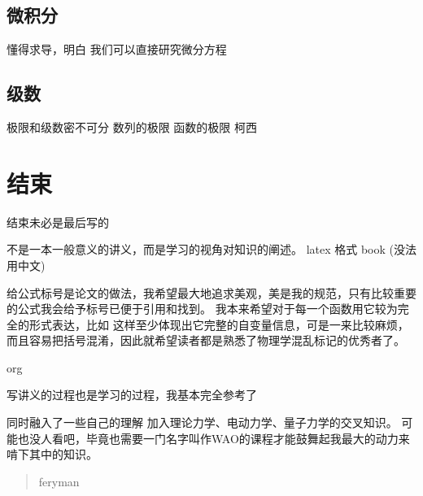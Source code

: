 \documentclass[11pt]{book}
\begin{document}
\chapter{微积分}
\label{sec:orgd871e60}
懂得求导，明白
我们可以直接研究微分方程
\chapter{级数}
\label{sec:org0e8a775}
极限和级数密不可分
数列的极限
函数的极限
柯西

\part{结束}
\label{sec:org2701e1a}
结束未必是最后写的

不是一本一般意义的讲义，而是学习的视角对知识的阐述。
latex 格式 book
(没法用中文)


给公式标号是论文的做法，我希望最大地追求美观，美是我的规范，只有比较重要的公式我会给予标号已便于引用和找到。
我本来希望对于每一个函数用它较为完全的形式表达，比如
这样至少体现出它完整的自变量信息，可是一来比较麻烦，而且容易把括号混淆，因此就希望读者都是熟悉了物理学混乱标记的优秀者了。

org

写讲义的过程也是学习的过程，我基本完全参考了

同时融入了一些自己的理解
加入理论力学、电动力学、量子力学的交叉知识。
可能也没人看吧，毕竟也需要一门名字叫作WAO的课程才能鼓舞起我最大的动力来啃下其中的知识。
\begin{quote}
feryman
\end{quote}
\end{document}
